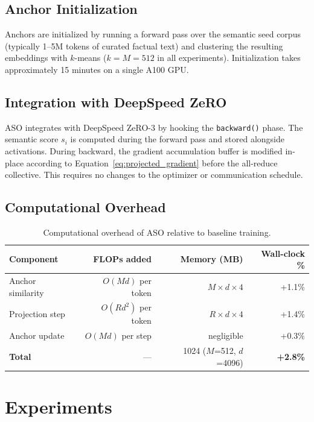 \documentclass[11pt,a4paper]{article}
\begin{document}
\subsection{Anchor Initialization}

Anchors are initialized by running a forward pass over the semantic seed corpus
(typically 1--5M tokens of curated factual text) and clustering the resulting embeddings
with $k$-means ($k = M = 512$ in all experiments). Initialization takes approximately
15 minutes on a single A100 GPU.

\subsection{Integration with DeepSpeed ZeRO}

ASO integrates with DeepSpeed ZeRO-3 by hooking the \texttt{backward()} phase. The
semantic score $s_i$ is computed during the forward pass and stored alongside activations.
During backward, the gradient accumulation buffer is modified in-place according to
Equation~\ref{eq:projected_gradient} before the all-reduce collective. This requires
no changes to the optimizer or communication schedule.

\subsection{Computational Overhead}

\begin{table}[H]
\centering
\caption{Computational overhead of ASO relative to baseline training.}
\begin{tabular}{lrrr}
\toprule
\textbf{Component} & \textbf{FLOPs added} & \textbf{Memory (MB)} & \textbf{Wall-clock \%} \\
\midrule
Anchor similarity & $O(Md)$ per token & $M \times d \times 4$ & +1.1\% \\
Projection step   & $O(Rd^2)$ per token & $R \times d \times 4$ & +1.4\% \\
Anchor update     & $O(Md)$ per step & negligible & +0.3\% \\
\midrule
\textbf{Total} & --- & 1024 ($M$=512, $d$=4096) & \textbf{+2.8\%} \\
\bottomrule
\end{tabular}
\label{tab:overhead}
\end{table}

\section{Experiments}
\label{sec:experiments}
\end{document}
